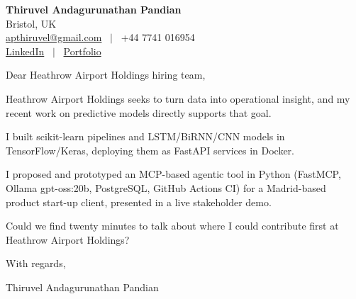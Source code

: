 \documentclass[11pt,a4paper]{article}
\begin{document}
\raggedright
\pagestyle{empty}

\begin{center}
    {\LARGE \color{linkblue} \textbf{Thiruvel Andagurunathan Pandian}}\\[0.2cm]
    Bristol, UK \\
    \href{mailto:apthiruvel@gmail.com}{apthiruvel@gmail.com} \ $|$ \ +44 7741 016954 \\
\href{https://www.linkedin.com/in/thiruvel-a-p/}{LinkedIn} \ $|$ \ \href{https://thiruvel-ap.github.io/PersonalPortfolio/}{Portfolio}
\end{center}

\vspace{0.4cm}

\noindent
Dear Heathrow Airport Holdings hiring team,

Heathrow Airport Holdings seeks to turn data into operational insight, and my recent work on predictive models directly supports that goal.

I built scikit-learn pipelines and LSTM/BiRNN/CNN models in TensorFlow/Keras, deploying them as FastAPI services in Docker.

I proposed and prototyped an MCP-based agentic tool in Python (FastMCP, Ollama gpt-oss:20b, PostgreSQL, GitHub Actions CI) for a Madrid-based product start-up client, presented in a live stakeholder demo.

Could we find twenty minutes to talk about where I could contribute first at Heathrow Airport Holdings?

\vspace{0.5cm}

With regards,

Thiruvel Andagurunathan Pandian
\end{document}
